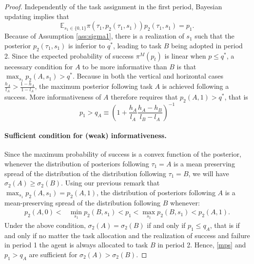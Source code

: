 \documentclass[12pt,american]{paper}
\theoremstyle{remark}
\begin{document}
\begin{proof}

Independently of the task assignment in the first period, Bayesian updating implies that 
\begin{equation}\label{mean}
\mathbb E_{s_1\in\{0,1\}}\pi (\tau_1,p_2(\tau_1,s_1)) p_2(\tau_1,s_1)=p_1.
\end{equation}
Because of Assumption \ref{ass:sigma1}, there is a realization of $s_1$ such that the posterior $p_2(\tau_1,s_1)$ is inferior to $q^*$, leading to  task $B$ being adopted in period 2. Since the expected probability of success $\pi^M(p_t)$ is linear when $p\leq q^*$, a necessary condition for $A$ to be more informative than $B$ is that $\max_{s_1}p_2(A,s_1)>q^*$.  Because in both the vertical and horizontal cases $\frac{h_A}{l_A}>\frac{1-h_A}{1-l_A}$, the maximum posterior following task $A$ is achieved following a success. More informativeness of $A$ therefore requires that $p_2(A,1)>q^*$, that is
\begin{equation}\label{q}
p_1 > q_A\equiv  \left(1+\frac{h_A}{l_A}\frac{h_A-h_B}{l_B-l_A}\right)^{-1}
\end{equation}
%
\paragraph{Sufficient condition for (weak) informativeness.} %

Since the maximum probability of success is a convex function of the posterior, whenever the distribution of posteriors following $\tau_1=A$ is a mean preserving spread of the distribution of the distribution following $\tau_1=B$, we will have $\sigma_2(A)\geq \sigma_2(B)$. Using our previous remark that $\max_{s_1}p_2(A,s_1)=p_2(A,1)$, the distribution of posteriors following $A$ is a mean-preserving spread of the distribution following $B$ whenever:
\begin{align}\label{mps}
p_2(A,0) < &\min_{s_1}p_2(B,s_1)<p_1<\max_{s_1}p_2(B,s_1) < p_2(A,1). \tag{MPS}
\end{align}
Under the above condition, $\sigma_2(A) = \sigma_2(B)$ if and only if $p_1\leq q_A$, that is if and only if no matter the task allocation and the realization of success and failure in period 1 the agent is always allocated to task $B$ in period 2. Hence, \eqref{mps} and $p_1> q_A$ are sufficient for  $\sigma_2(A) > \sigma_2(B)$.


\end{proof}
\end{document}
